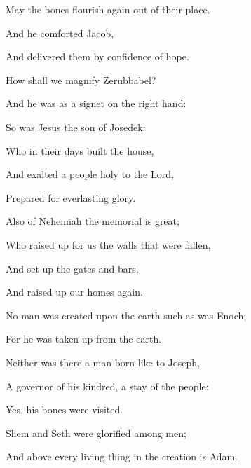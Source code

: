 {{}
\par }{\Q May the bones flourish again out of their place.
\par }{\Q And he comforted Jacob,
\par }{\Q And delivered them by confidence of hope.
\par }{\BB \par }{\Q {}How shall we magnify Zerubbabel?
\par }{\Q And he was as a signet on the right hand:
\par }{\Q {}So was Jesus the son of Josedek:
\par }{\Q Who in their days built the house,
\par }{\Q And exalted a
 people holy to the Lord,
\par }{\Q Prepared for everlasting glory.
\par }{\Q {}Also of Nehemiah the memorial is great;
\par }{\Q Who raised up for us the walls that were fallen,
\par }{\Q And set up the gates and bars,
\par }{\Q And raised up our homes again.
\par }{\BB \par }{\Q {}No man was created upon the earth such as was Enoch;
\par }{\Q For he was taken up from the earth.
\par }{\Q {}Neither was there a man born like to Joseph,
\par }{\Q A governor of his kindred, a stay of the people:
\par }{\Q Yes, his bones were visited.
\par }{\Q {}Shem and Seth were glorified among men;
\par }{\Q And above every living thing in the creation is Adam.
\par }{\BB \par }
